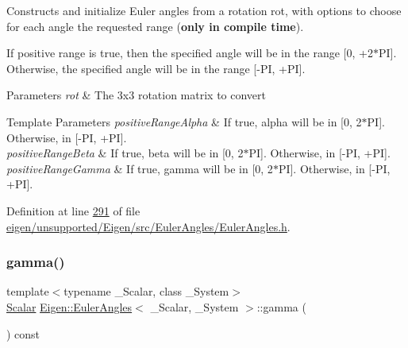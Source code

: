 Constructs and initialize Euler angles from a rotation {\ttfamily rot}, with options to choose for each angle the requested range ({\bfseries only in compile time}).

If positive range is true, then the specified angle will be in the range \mbox{[}0, +2$\ast$\+PI\mbox{]}. Otherwise, the specified angle will be in the range \mbox{[}-\/\+PI, +\+PI\mbox{]}.


\begin{DoxyParams}{Parameters}
{\em rot} & The 3x3 rotation matrix to convert \\
\hline
\end{DoxyParams}

\begin{DoxyTemplParams}{Template Parameters}
{\em positive\+Range\+Alpha} & If true, alpha will be in \mbox{[}0, 2$\ast$\+PI\mbox{]}. Otherwise, in \mbox{[}-\/\+PI, +\+PI\mbox{]}. \\
\hline
{\em positive\+Range\+Beta} & If true, beta will be in \mbox{[}0, 2$\ast$\+PI\mbox{]}. Otherwise, in \mbox{[}-\/\+PI, +\+PI\mbox{]}. \\
\hline
{\em positive\+Range\+Gamma} & If true, gamma will be in \mbox{[}0, 2$\ast$\+PI\mbox{]}. Otherwise, in \mbox{[}-\/\+PI, +\+PI\mbox{]}. \\
\hline
\end{DoxyTemplParams}


Definition at line \hyperlink{eigen_2unsupported_2_eigen_2src_2_euler_angles_2_euler_angles_8h_source_l00291}{291} of file \hyperlink{eigen_2unsupported_2_eigen_2src_2_euler_angles_2_euler_angles_8h_source}{eigen/unsupported/\+Eigen/src/\+Euler\+Angles/\+Euler\+Angles.\+h}.

\mbox{\label{class_eigen_1_1_euler_angles_aa75a5f16105d96eedf81bf9f8e789e21}} 
\subsubsection{\texorpdfstring{gamma()}{gamma()}\hspace{0.1cm}{\footnotesize\ttfamily [1/4]}}
{\footnotesize\ttfamily template$<$typename \+\_\+\+Scalar, class \+\_\+\+System$>$ \\
\hyperlink{class_eigen_1_1_euler_angles_a2ab1d433ac9683268446f8905ac31aac}{Scalar} \hyperlink{class_eigen_1_1_euler_angles}{Eigen\+::\+Euler\+Angles}$<$ \+\_\+\+Scalar, \+\_\+\+System $>$\+::gamma (\begin{DoxyParamCaption}{ }\end{DoxyParamCaption}) const\hspace{0.3cm}{\ttfamily [inline]}}


